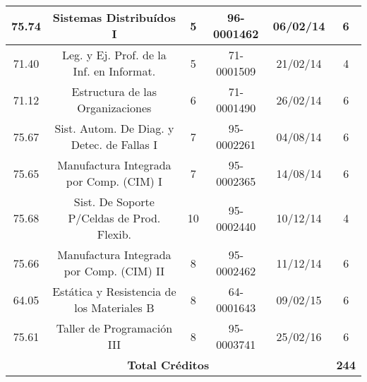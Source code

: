 {\begin{center}
\begin{tabular}{|c|c|c|c|c|c|}
            \hline 
            75.74 & Sistemas Distribuídos I                    & 5  & 96-0001462 & 06/02/14 & 6 \\
            \hline
            71.40 & Leg. y Ej. Prof. de la Inf. en Informat.   & 5  & 71-0001509 & 21/02/14 & 4 \\
            \hline
            71.12 & Estructura de las Organizaciones           & 6  & 71-0001490 & 26/02/14 & 6 \\
            \hline
            75.67 & Sist. Autom. De Diag. y Detec. de Fallas I & 7  & 95-0002261 & 04/08/14 & 6 \\
            \hline
            75.65 & Manufactura Integrada por Comp. (CIM) I    & 7  & 95-0002365 & 14/08/14 & 6 \\
            \hline
            75.68 & Sist. De Soporte P/Celdas de Prod. Flexib. & 10 & 95-0002440 & 10/12/14 & 4 \\
            \hline
            75.66 & Manufactura Integrada por Comp. (CIM) II   & 8  & 95-0002462 & 11/12/14 & 6 \\
            \hline
            64.05 & Estática y Resistencia de los Materiales B & 8  & 64-0001643 & 09/02/15 & 6 \\
            \hline
            75.61 & Taller de Programación III                 & 8  & 95-0003741 & 25/02/16 & 6 \\
            \hline
            \multicolumn{5}{|c|}{\textbf{Total Créditos}} & \textbf{244} \\
            \hline
        \end{tabular}
        \end{center}
    }
